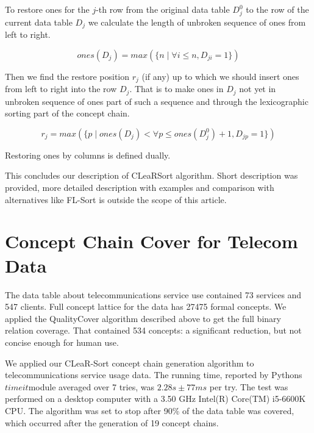 \documentclass[acmconf,authordraft]{acmart}
\begin{document}
To restore ones for the $j$-th row from the original data table $D^0_j$ to the row of the current data table $D_j$ we calculate the length of unbroken sequence of ones from left to right.

\begin{equation}
ones(D_j) = max(\{n \mid \forall i \leq n, D_{ji}=1\})
\label{ones}
\end{equation}

Then we find the restore position $r_j$ (if any) up to which we should insert ones from left to right into the row $D_j$. That is to make ones in $D_j$ not yet in unbroken sequence of ones part of such a sequence and through the lexicographic sorting part of the concept chain.

\begin{equation}
r_j = max(\{p \mid   ones(D_j) < \forall p \leq ones(D^0_j)+1, D_{jp}=1\})
\label{restore}
\end{equation}

Restoring ones by columns is defined dually.


This concludes our description of CLeaRSort algorithm. Short description was provided, more detailed description with examples and comparison with alternatives like FL-Sort is outside the scope of this article.


\section{Concept Chain Cover for Telecom Data}

The data table about telecommunications service use contained 73 services and 547 clients. Full concept lattice for the data has 27475 formal concepts. We applied the QualityCover algorithm described above to get the full binary relation coverage. That contained 534 concepts: a significant reduction, but not concise enough for human use.

We applied our CLeaR-Sort  concept chain generation algorithm to telecommunications service usage data.  The running time, reported by Pythons $timeit$module  averaged over 7 tries, was $2.28 s \pm 77 ms$ per try. The test was performed on a desktop computer with a 3.50 GHz Intel(R) Core(TM) i5-6600K CPU. The algorithm was set to stop after 90\% of the data table was covered, which occurred after the generation of 19 concept chains. 
\end{document}
